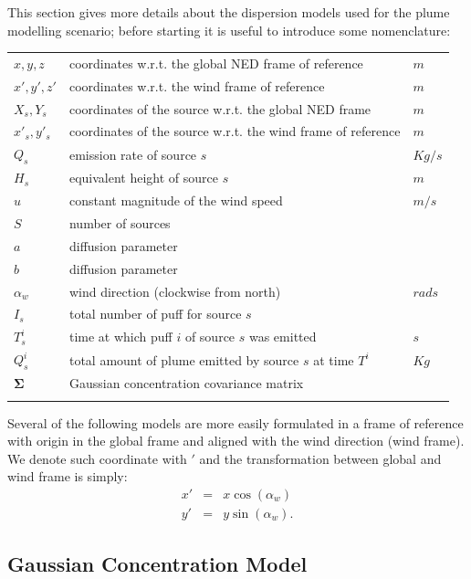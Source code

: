 \documentclass[a4paper,11pt]{report}
\begin{document}
This section gives more details about the dispersion models used for the plume modelling scenario; before starting it is useful to introduce some nomenclature:
\begin{longtable}{l l l}
$x,y,z$ & coordinates w.r.t. the global NED frame of reference & $m$\\
$x',y',z'$ & coordinates w.r.t. the wind frame of reference & $m$\\
$X_s,Y_s$ & coordinates of the source w.r.t. the global NED frame  & $m$\\
$x\prime_s,y'_s$ & coordinates of the source w.r.t. the wind frame of reference  & $m$\\
$Q_s$ & emission rate of source $s$ & $Kg/s$\\
$H_s$ & equivalent height of source $s$ & $m$\\
$u$ & constant magnitude of the wind speed & $m/s$\\
$S$ & number of sources & \\
$a$ & diffusion parameter & \\
$b$ & diffusion parameter & \\
$\alpha_w$ & wind direction (clockwise from north) & $rads$\\
$I_s$ & total number of puff for source $s$ & \\
$T^i_s$ & time at which puff $i$ of source $s$ was emitted & $s$\\
$Q^i_s$ & total amount of plume emitted by source $s$ at time $T^i$ & $Kg$\\
$\boldsymbol\Sigma$ & Gaussian concentration covariance matrix \\
\label{tab:naming2}
\end{longtable}

Several of the following models are more easily formulated in a frame of reference with origin in the global frame and aligned with the wind direction (wind frame). We denote such coordinate with $'$ and the transformation between global and wind frame is simply:
\begin{eqnarray}
x' &=& x \cos(\alpha_w) \\
y' &=& y \sin(\alpha_w).
\end{eqnarray}

\subsection{Gaussian Concentration Model} \label{3dgauss}
\end{document}
